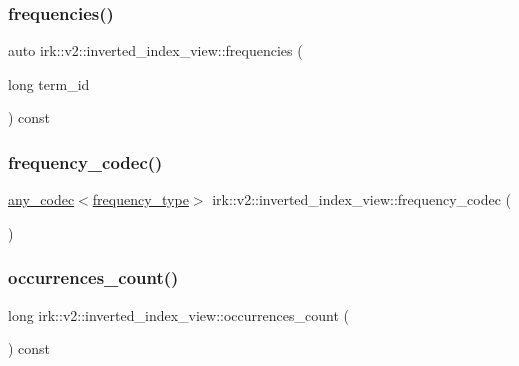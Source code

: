 \subsubsection{\texorpdfstring{frequencies()}{frequencies()}}
{\footnotesize\ttfamily auto irk\+::v2\+::inverted\+\_\+index\+\_\+view\+::frequencies (\begin{DoxyParamCaption}\item[{long}]{term\+\_\+id }\end{DoxyParamCaption}) const\hspace{0.3cm}{\ttfamily [inline]}}

\mbox{\label{classirk_1_1v2_1_1inverted__index__view_aacf229a3a8f3eddb0181cc0df59ada3a}} 
\subsubsection{\texorpdfstring{frequency\+\_\+codec()}{frequency\_codec()}}
{\footnotesize\ttfamily \mbox{\hyperlink{namespaceirk_a831a3a869cf19601dbfb5c41765a2e87}{any\+\_\+codec}}$<$\mbox{\hyperlink{classirk_1_1v2_1_1inverted__index__view_ab52405d4c17e6e82893d2650a56e0a32}{frequency\+\_\+type}}$>$ irk\+::v2\+::inverted\+\_\+index\+\_\+view\+::frequency\+\_\+codec (\begin{DoxyParamCaption}{ }\end{DoxyParamCaption})\hspace{0.3cm}{\ttfamily [inline]}}

\mbox{\label{classirk_1_1v2_1_1inverted__index__view_aeb876faef5e15b4567e3347b871fb978}} 
\subsubsection{\texorpdfstring{occurrences\+\_\+count()}{occurrences\_count()}}
{\footnotesize\ttfamily long irk\+::v2\+::inverted\+\_\+index\+\_\+view\+::occurrences\+\_\+count (\begin{DoxyParamCaption}{ }\end{DoxyParamCaption}) const\hspace{0.3cm}{\ttfamily [inline]}}

